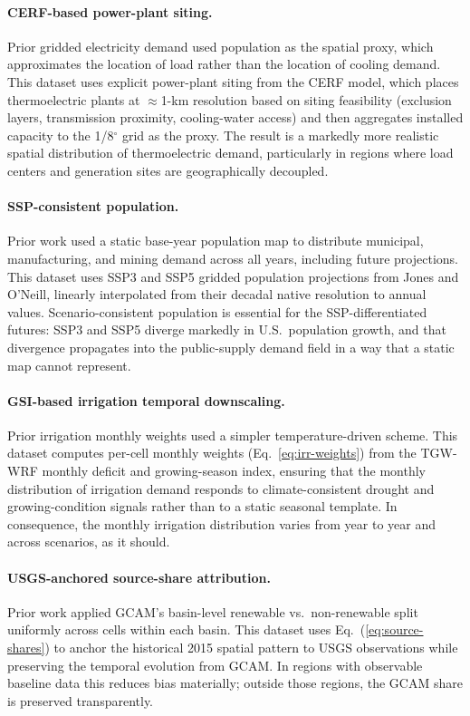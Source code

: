 \documentclass[fleqn,10pt]{wlscirep}
\begin{document}
\paragraph{CERF-based power-plant siting.} Prior gridded electricity demand used population as the spatial proxy, which approximates the location of load rather than the location of cooling demand. This dataset uses explicit power-plant siting from the CERF model\cite{Vernon2021}, which places thermoelectric plants at $\approx$1-km resolution based on siting feasibility (exclusion layers, transmission proximity, cooling-water access) and then aggregates installed capacity to the 1/8$^{\circ}$ grid as the proxy. The result is a markedly more realistic spatial distribution of thermoelectric demand, particularly in regions where load centers and generation sites are geographically decoupled.

\paragraph{SSP-consistent population.} Prior work used a static base-year population map to distribute municipal, manufacturing, and mining demand across all years, including future projections. This dataset uses SSP3 and SSP5 gridded population projections from Jones and O'Neill\cite{Jones_2016}, linearly interpolated from their decadal native resolution to annual values. Scenario-consistent population is essential for the SSP-differentiated futures: SSP3 and SSP5 diverge markedly in U.S.~population growth, and that divergence propagates into the public-supply demand field in a way that a static map cannot represent.

\paragraph{GSI-based irrigation temporal downscaling.} Prior irrigation monthly weights used a simpler temperature-driven scheme. This dataset computes per-cell monthly weights (Eq.~\ref{eq:irr-weights}) from the TGW-WRF monthly deficit and growing-season index, ensuring that the monthly distribution of irrigation demand responds to climate-consistent drought and growing-condition signals rather than to a static seasonal template. In consequence, the monthly irrigation distribution varies from year to year and across scenarios, as it should.

\paragraph{USGS-anchored source-share attribution.} Prior work applied GCAM's basin-level renewable vs.\ non-renewable split uniformly across cells within each basin. This dataset uses Eq.~(\ref{eq:source-shares}) to anchor the historical 2015 spatial pattern to USGS observations while preserving the temporal evolution from GCAM. In regions with observable baseline data this reduces bias materially; outside those regions, the GCAM share is preserved transparently.
\end{document}
